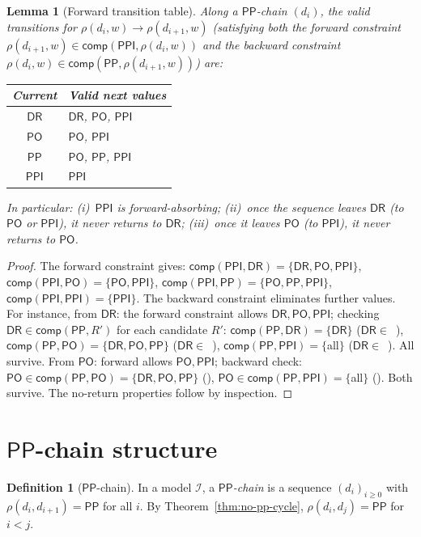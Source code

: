 \documentclass[a4paper,11pt]{article}
\newtheorem{lemma}[theorem]{Lemma}
\theoremstyle{definition}
\newtheorem{definition}[theorem]{Definition}
\newcommand{\DR}{\ensuremath{\mathsf{DR}}}
\newcommand{\PO}{\ensuremath{\mathsf{PO}}}
\newcommand{\PP}{\ensuremath{\mathsf{PP}}}
\newcommand{\PPI}{\ensuremath{\mathsf{PPI}}}
\newcommand{\comp}{\ensuremath{\mathsf{comp}}}
\newcommand{\interp}{\ensuremath{\mathcal{I}}}
\begin{document}
\begin{lemma}[Forward transition table]\label{lem:forward}
Along a $\PP$-chain $(d_i)$, the valid transitions for
$\rho(d_i, w) \to \rho(d_{i+1}, w)$ (satisfying \emph{both} the
forward constraint
$\rho(d_{i+1}, w) \in \comp(\PPI, \rho(d_i, w))$ and the backward
constraint
$\rho(d_i, w) \in \comp(\PP, \rho(d_{i+1}, w))$) are:
\begin{center}
\renewcommand{\arraystretch}{1.15}
\begin{tabular}{cl}
\toprule
\textbf{Current} & \textbf{Valid next values} \\
\midrule
$\DR$ & $\DR$, $\PO$, $\PPI$ \\
$\PO$ & $\PO$, $\PPI$ \\
$\PP$ & $\PO$, $\PP$, $\PPI$ \\
$\PPI$ & $\PPI$ \\
\bottomrule
\end{tabular}
\end{center}
In particular: (i)~$\PPI$ is forward-absorbing; (ii)~once the
sequence leaves $\DR$ (to $\PO$ or $\PPI$), it never returns to
$\DR$; (iii)~once it leaves $\PO$ (to $\PPI$), it never returns
to $\PO$.
\end{lemma}

\begin{proof}
The forward constraint gives:
$\comp(\PPI, \DR) = \{\DR,\PO,\PPI\}$,
$\comp(\PPI, \PO) = \{\PO,\PPI\}$,
$\comp(\PPI, \PP) = \{\PO,\PP,\PPI\}$,
$\comp(\PPI, \PPI) = \{\PPI\}$.
The backward constraint eliminates further values.  For instance,
from $\DR$: the forward constraint allows $\DR, \PO, \PPI$; checking
$\DR \in \comp(\PP, R')$ for each candidate $R'$: $\comp(\PP, \DR) =
\{\DR\}$ ($\DR \in$~\checkmark), $\comp(\PP, \PO) = \{\DR, \PO, \PP\}$
($\DR \in$~\checkmark), $\comp(\PP, \PPI) = \{$all$\}$
($\DR \in$~\checkmark).  All survive.  From $\PO$: forward allows
$\PO, \PPI$; backward check: $\PO \in \comp(\PP, \PO) =
\{\DR, \PO, \PP\}$ (\checkmark), $\PO \in \comp(\PP, \PPI) =
\{$all$\}$ (\checkmark).  Both survive.  The no-return properties
follow by inspection.
\end{proof}


\section{$\PP$-chain structure}\label{sec:chain}

\begin{definition}[$\PP$-chain]
In a model $\interp$, a \emph{$\PP$-chain} is a sequence
$(d_i)_{i \ge 0}$ with $\rho(d_i, d_{i+1}) = \PP$ for all $i$.
By Theorem~\ref{thm:no-pp-cycle}, $\rho(d_i, d_j) = \PP$ for $i < j$.
\end{definition}
\end{document}

